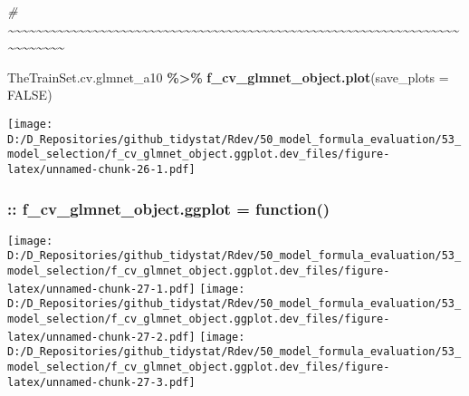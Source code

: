 \documentclass[
]{article}
\newenvironment{Shaded}{\begin{snugshade}}{\end{snugshade}}
\newcommand{\AttributeTok}[1]{\textcolor[rgb]{0.13,0.29,0.53}{#1}}
\newcommand{\CommentTok}[1]{\textcolor[rgb]{0.56,0.35,0.01}{\textit{#1}}}
\newcommand{\ConstantTok}[1]{\textcolor[rgb]{0.56,0.35,0.01}{#1}}
\newcommand{\FunctionTok}[1]{\textcolor[rgb]{0.13,0.29,0.53}{\textbf{#1}}}
\newcommand{\NormalTok}[1]{#1}
\newcommand{\SpecialCharTok}[1]{\textcolor[rgb]{0.81,0.36,0.00}{\textbf{#1}}}
\begin{document}
\begin{Shaded}
\begin{Highlighting}[]
\CommentTok{\#     \textasciitilde{}\textasciitilde{}\textasciitilde{}\textasciitilde{}\textasciitilde{}\textasciitilde{}\textasciitilde{}\textasciitilde{}\textasciitilde{}\textasciitilde{}\textasciitilde{}\textasciitilde{}\textasciitilde{}\textasciitilde{}\textasciitilde{}\textasciitilde{}\textasciitilde{}\textasciitilde{}\textasciitilde{}\textasciitilde{}\textasciitilde{}\textasciitilde{}\textasciitilde{}\textasciitilde{}\textasciitilde{}\textasciitilde{}\textasciitilde{}\textasciitilde{}\textasciitilde{}\textasciitilde{}\textasciitilde{}\textasciitilde{}\textasciitilde{}\textasciitilde{}\textasciitilde{}\textasciitilde{}\textasciitilde{}\textasciitilde{}\textasciitilde{}\textasciitilde{}\textasciitilde{}\textasciitilde{}\textasciitilde{}\textasciitilde{}\textasciitilde{}\textasciitilde{}\textasciitilde{}\textasciitilde{}\textasciitilde{}\textasciitilde{}\textasciitilde{}\textasciitilde{}\textasciitilde{}\textasciitilde{}\textasciitilde{}\textasciitilde{}\textasciitilde{}\textasciitilde{}\textasciitilde{}\textasciitilde{}\textasciitilde{}\textasciitilde{}\textasciitilde{}\textasciitilde{}\textasciitilde{}\textasciitilde{}\textasciitilde{}\textasciitilde{}\textasciitilde{}\textasciitilde{}\textasciitilde{}\textasciitilde{}}

\NormalTok{TheTrainSet.cv.glmnet\_a10 }\SpecialCharTok{\%\textgreater{}\%} \FunctionTok{f\_cv\_glmnet\_object.plot}\NormalTok{(}\AttributeTok{save\_plots =} \ConstantTok{FALSE}\NormalTok{)}
\end{Highlighting}
\end{Shaded}

\texttt{[image: D:/D\_Repositories/github\_tidystat/Rdev/50\_model\_formula\_evaluation/53\_model\_selection/f\_cv\_glmnet\_object.ggplot.dev\_files/figure-latex/unnamed-chunk-26-1.pdf]}

\hypertarget{f_cv_glmnet_object.ggplot-function}{%
\subsubsection{:: f\_cv\_glmnet\_object.ggplot =
function()}\label{f_cv_glmnet_object.ggplot-function}}

\texttt{[image: D:/D\_Repositories/github\_tidystat/Rdev/50\_model\_formula\_evaluation/53\_model\_selection/f\_cv\_glmnet\_object.ggplot.dev\_files/figure-latex/unnamed-chunk-27-1.pdf]}
\texttt{[image: D:/D\_Repositories/github\_tidystat/Rdev/50\_model\_formula\_evaluation/53\_model\_selection/f\_cv\_glmnet\_object.ggplot.dev\_files/figure-latex/unnamed-chunk-27-2.pdf]}
\texttt{[image: D:/D\_Repositories/github\_tidystat/Rdev/50\_model\_formula\_evaluation/53\_model\_selection/f\_cv\_glmnet\_object.ggplot.dev\_files/figure-latex/unnamed-chunk-27-3.pdf]}
\end{document}
